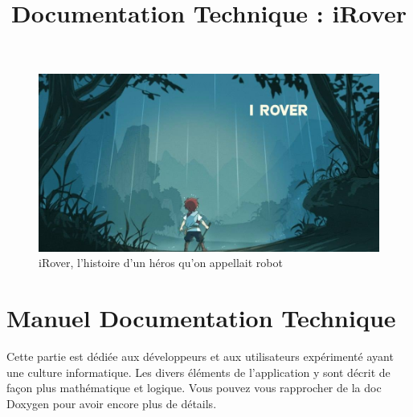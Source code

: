 \documentclass[a4paper 12pts]{article}
\title{Documentation Technique : iRover}
\author{}
\begin{document}
\maketitle


\begin{figure}[h]
   \includegraphics[width=350pt]{Illustration/proj_irover.jpg}
	\caption{iRover, l'histoire d'un héros qu'on appellait robot}
\end{figure}



\newpage


\renewcommand{\contentsname}{Sommaire} 
\tableofcontents

\newpage





\section{Manuel Documentation Technique}


\vspace{2cm}

Cette partie est dédiée aux développeurs et aux utilisateurs expérimenté ayant une culture informatique.
Les divers éléments de l'application y sont décrit de façon plus mathématique et logique.
Vous pouvez vous rapprocher de la doc Doxygen pour avoir encore plus de détails.
\end{document}
